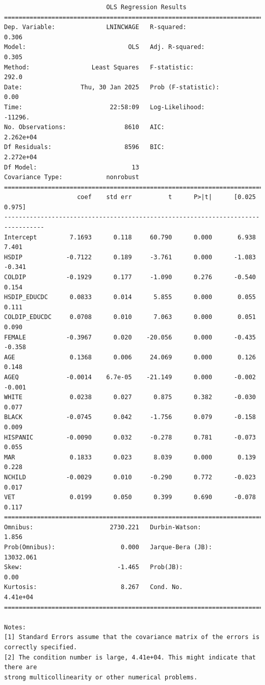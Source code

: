 \documentclass[
  11pt,
  letterpaper,
  DIV=11,
  numbers=noendperiod]{scrartcl}
\begin{document}
\begin{verbatim}
                            OLS Regression Results                            
==============================================================================
Dep. Variable:              LNINCWAGE   R-squared:                       0.306
Model:                            OLS   Adj. R-squared:                  0.305
Method:                 Least Squares   F-statistic:                     292.0
Date:                Thu, 30 Jan 2025   Prob (F-statistic):               0.00
Time:                        22:58:09   Log-Likelihood:                -11296.
No. Observations:                8610   AIC:                         2.262e+04
Df Residuals:                    8596   BIC:                         2.272e+04
Df Model:                          13                                         
Covariance Type:            nonrobust                                         
=================================================================================
                    coef    std err          t      P>|t|      [0.025      0.975]
---------------------------------------------------------------------------------
Intercept         7.1693      0.118     60.790      0.000       6.938       7.401
HSDIP            -0.7122      0.189     -3.761      0.000      -1.083      -0.341
COLDIP           -0.1929      0.177     -1.090      0.276      -0.540       0.154
HSDIP_EDUCDC      0.0833      0.014      5.855      0.000       0.055       0.111
COLDIP_EDUCDC     0.0708      0.010      7.063      0.000       0.051       0.090
FEMALE           -0.3967      0.020    -20.056      0.000      -0.435      -0.358
AGE               0.1368      0.006     24.069      0.000       0.126       0.148
AGEQ             -0.0014    6.7e-05    -21.149      0.000      -0.002      -0.001
WHITE             0.0238      0.027      0.875      0.382      -0.030       0.077
BLACK            -0.0745      0.042     -1.756      0.079      -0.158       0.009
HISPANIC         -0.0090      0.032     -0.278      0.781      -0.073       0.055
MAR               0.1833      0.023      8.039      0.000       0.139       0.228
NCHILD           -0.0029      0.010     -0.290      0.772      -0.023       0.017
VET               0.0199      0.050      0.399      0.690      -0.078       0.117
==============================================================================
Omnibus:                     2730.221   Durbin-Watson:                   1.856
Prob(Omnibus):                  0.000   Jarque-Bera (JB):            13032.061
Skew:                          -1.465   Prob(JB):                         0.00
Kurtosis:                       8.267   Cond. No.                     4.41e+04
==============================================================================

Notes:
[1] Standard Errors assume that the covariance matrix of the errors is correctly specified.
[2] The condition number is large, 4.41e+04. This might indicate that there are
strong multicollinearity or other numerical problems.
\end{verbatim}
\end{document}
